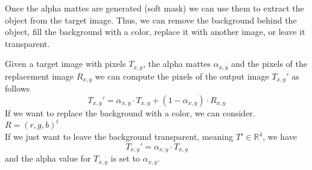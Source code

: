 \documentclass[a4paper]{article}
\begin{document}
Once the alpha mattes are generated (soft mask) we can use them
to extract the object from the target image.
Thus, we can remove the background behind the object,
fill the background with a color, replace it with another image,
or leave it transparent.

Given a target image with pixels \(T_{x,y}\), the alpha
mattes \(\alpha_{x,y}\) and the pixels of the replacement image
\(R_{x,y}\) we can compute the pixels of the output image \(T_{x,y}'\)
as follows
\[
    T_{x,y}' = 
    \alpha_{x,y} \cdot T_{x,y} + (1 - \alpha_{x,y}) \cdot R_{x,y}
\]
If we want to replace the background with a color, we can consider.
\(R={(r,g,b)}^t\) \\
If we just want to leave the background transparent, meaning
\(T' \in {\mathbb{R}}^4\), we have
\[
    T_{x,y}' = 
    \alpha_{x,y} \cdot T_{x,y}
\]
and the alpha value for \(T_{x,y}\) is set to \(\alpha_{x,y}\).
\end{document}
